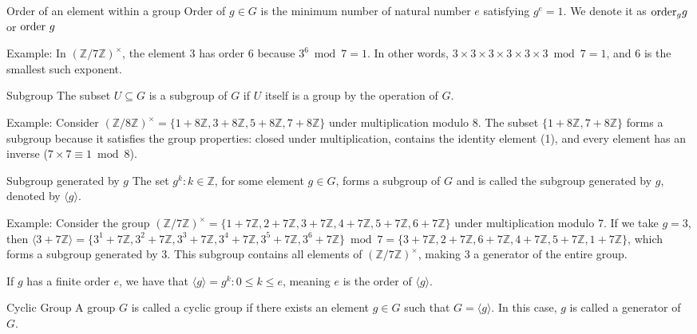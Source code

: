 \documentclass{article}
\begin{document}
\begin{definition}{Order of an element within a group}{}
    Order of $g \in G$ is the minimum number of natural number $e$ satisfying $g^{e} = 1$. We denote it as $\hbox{order}_g g$ or $\hbox{order } g$
\end{definition}

Example: In $(\mathbb{Z}/7\mathbb{Z})^{\times}$, the element 3 has order 6 because $3^6 \bmod 7 = 1$. In other words, $3 \times 3 \times 3 \times 3 \times 3 \times 3 \bmod 7 = 1$, and 6 is the smallest such exponent.

\begin{definition}{Subgroup}{}
    The subset $U \subseteq G$ is a subgroup of $G$ if $U$ itself is a group by the operation of $G$.
\end{definition}

Example: Consider $(\mathbb{Z}/8\mathbb{Z})^{\times} = \{1 + 8\mathbb{Z}, 3+ 8\mathbb{Z}, 5+ 8\mathbb{Z}, 7+ 8\mathbb{Z}\}$ under multiplication modulo 8. The subset $\{1+ 8\mathbb{Z}, 7+ 8\mathbb{Z}\}$ forms a subgroup because it satisfies the group properties: closed under multiplication, contains the identity element (1), and every element has an inverse ($7 \times 7 \equiv 1 \bmod 8$).

\begin{definition}{Subgroup generated by $g$}{} The set ${g^{k} : k \in \mathbb{Z}}$, for some element $g \in G$, forms a subgroup of $G$ and is called the subgroup generated by $g$, denoted by $\langle g \rangle$. \end{definition}

Example: Consider the group $(\mathbb{Z}/7\mathbb{Z})^{\times} = \{1+ 7\mathbb{Z}, 2+ 7\mathbb{Z}, 3+ 7\mathbb{Z}, 4+ 7\mathbb{Z}, 5+ 7\mathbb{Z}, 6+ 7\mathbb{Z}\}$ under multiplication modulo 7. If we take $g = 3$, then $\langle 3 +7\mathbb{Z} \rangle = \{3^1+7\mathbb{Z}, 3^2+7\mathbb{Z}, 3^3+7\mathbb{Z}, 3^4+7\mathbb{Z}, 3^5+7\mathbb{Z}, 3^6+7\mathbb{Z}\} \bmod 7 = \{3+7\mathbb{Z}, 2+7\mathbb{Z}, 6+7\mathbb{Z}, 4+7\mathbb{Z}, 5+7\mathbb{Z}, 1+7\mathbb{Z}\}$, which forms a subgroup generated by 3. This subgroup contains all elements of $(\mathbb{Z}/7\mathbb{Z})^{\times}$, making 3 a generator of the entire group.

If $g$ has a finite order $e$, we have that $\langle g \rangle = {g^{k}: 0 \leq k \leq e}$, meaning $e$ is the order of $\langle g \rangle$.

\begin{definition}{Cyclic Group}{} A group $G$ is called a cyclic group if there exists an element $g \in G$ such that $G = \langle g \rangle$. In this case, $g$ is called a generator of $G$. \end{definition}
\end{document}
